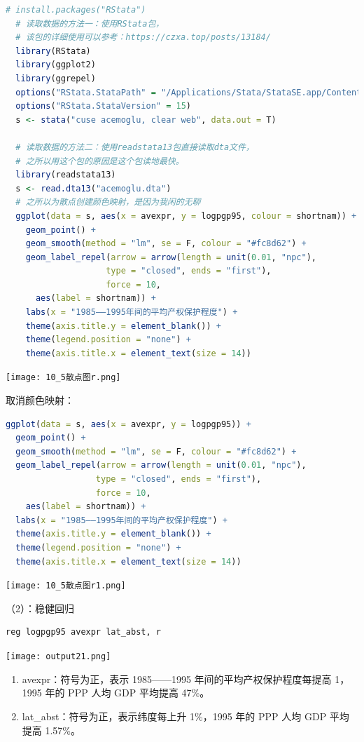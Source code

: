 \documentclass[cn,fancy,blue,11pt]{elegantbook}
\begin{document}
\begin{lstlisting}[language = R]
  # install.packages("RStata")
  # 读取数据的方法一：使用RStata包，
  # 该包的详细使用可以参考：https://czxa.top/posts/13184/
  library(RStata)
  library(ggplot2)
  library(ggrepel)
  options("RStata.StataPath" = "/Applications/Stata/StataSE.app/Contents/MacOS/stata-se")
  options("RStata.StataVersion" = 15)
  s <- stata("cuse acemoglu, clear web", data.out = T)

  # 读取数据的方法二：使用readstata13包直接读取dta文件，
  # 之所以用这个包的原因是这个包读地最快。
  library(readstata13)
  s <- read.dta13("acemoglu.dta")
  # 之所以为散点创建颜色映射，是因为我闲的无聊
  ggplot(data = s, aes(x = avexpr, y = logpgp95, colour = shortnam)) +
    geom_point() +
    geom_smooth(method = "lm", se = F, colour = "#fc8d62") +
    geom_label_repel(arrow = arrow(length = unit(0.01, "npc"),
                    type = "closed", ends = "first"),
                    force = 10,
      aes(label = shortnam)) +
    labs(x = "1985——1995年间的平均产权保护程度") +
    theme(axis.title.y = element_blank()) +
    theme(legend.position = "none") +
    theme(axis.title.x = element_text(size = 14))
\end{lstlisting}

\noindent\texttt{[image: 10\_5散点图r.png]}

取消颜色映射：

\begin{lstlisting}[language = R]
ggplot(data = s, aes(x = avexpr, y = logpgp95)) +
  geom_point() +
  geom_smooth(method = "lm", se = F, colour = "#fc8d62") +
  geom_label_repel(arrow = arrow(length = unit(0.01, "npc"),
                  type = "closed", ends = "first"),
                  force = 10,
    aes(label = shortnam)) +
  labs(x = "1985——1995年间的平均产权保护程度") +
  theme(axis.title.y = element_blank()) +
  theme(legend.position = "none") +
  theme(axis.title.x = element_text(size = 14))
\end{lstlisting}

\noindent\texttt{[image: 10\_5散点图r1.png]}

（2）：稳健回归

\begin{lstlisting}
reg logpgp95 avexpr lat_abst, r
\end{lstlisting}

\noindent\texttt{[image: output21.png]}

\begin{enumerate}
\item
  avexpr：符号为正，表示 1985------1995 年间的平均产权保护程度每提高 1，1995 年的 PPP 人均 GDP 平均提高 47\%。
\item
  lat\_abst：符号为正，表示纬度每上升 1\%，1995 年的 PPP 人均 GDP 平均提高 1.57\%。
\end{enumerate}
\end{document}
